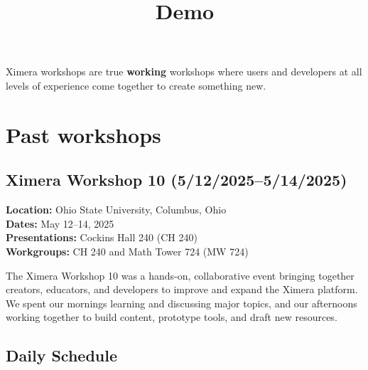 \documentclass{ximera}
\title{Demo}
\begin{document}
\begin{abstract}
\end{abstract}
\maketitle

Ximera workshops are true \textbf{working} workshops where users and developers at all levels of experience come together to create something new.

\section*{Past workshops}


\subsection*{Ximera Workshop 10 (5/12/2025--5/14/2025)}

\textbf{Location:} Ohio State University, Columbus, Ohio\\
\textbf{Dates:} May 12--14, 2025\\
\textbf{Presentations:} Cockins Hall 240 (CH 240)\\
\textbf{Workgroups:} CH 240 and Math Tower 724 (MW 724)

The Ximera Workshop 10 was a hands-on, collaborative event bringing together creators, educators, and developers to improve and expand the Ximera platform. 
%
We spent our mornings learning and discussing major topics, and our afternoons working together to build content, prototype tools, and draft new resources.

\subsection*{Daily Schedule}
\end{document}
